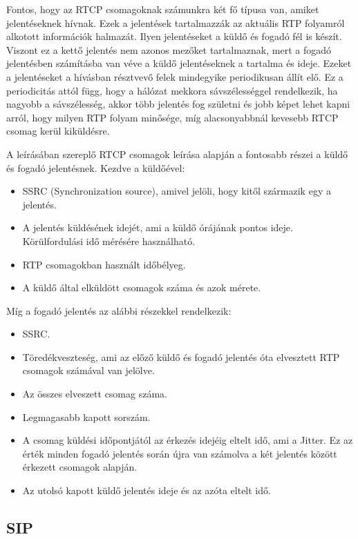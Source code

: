 Fontos, hogy az RTCP csomagoknak számunkra két fő típusa van, amiket jelentéseknek hívnak.
Ezek a jelentések tartalmazzák az aktuális RTP folyamról alkotott információk halmazát. 
Ilyen jelentéseket a küldő és fogadó fél is készít. Viszont ez a kettő jelentés 
nem azonos mezőket tartalmaznak, mert a fogadó jelentésben számításba van véve a küldő 
jelentéseknek a tartalma és ideje. Ezeket a jelentéseket a hívásban résztvevő felek 
mindegyike periodikusan állít elő. Ez a periodicitás attól függ, hogy a hálózat mekkora 
sávszélességgel rendelkezik, ha nagyobb a sávszélesség, akkor több jelentés fog születni 
és jobb képet lehet kapni arról, hogy milyen RTP folyam minősége, míg alacsonyabbnál 
kevesebb RTCP csomag kerül kiküldésre. 

A \cite{RFC3550} leírásában szereplő RTCP csomagok leírása alapján a fontosabb részei a
küldő és fogadó jelentésnek. Kezdve a küldőével: 

\begin{itemize}
	\item SSRC (Synchronization source), amivel jelöli, hogy kitől származik egy a 
	jelentés.
	\item A jelentés küldésének idejét, ami a küldő órájának pontos ideje. Körülfordulási
	idő mérésére használható. 
	\item RTP csomagokban használt időbélyeg. 
	\item A küldő által elküldött csomagok száma és azok mérete.
\end{itemize}

Míg a fogadó jelentés az alábbi részekkel rendelkezik:

\begin{itemize}
	\item SSRC.
	\item Töredékveszteség, ami az előző küldő és fogadó jelentés óta elvesztett RTP 
	csomagok számával van jelölve.
	\item Az összes elveszett csomag száma. 
	\item Legmagasabb kapott sorszám. 
	\item A csomag küldési időpontjától az érkezés idejéig eltelt idő, ami a Jitter. Ez 
	az érték minden fogadó jelentés során újra van számolva a két jelentés között 
	érkezett csomagok alapján.
	\item Az utolsó kapott küldő jelentés ideje és az azóta eltelt idő.  
\end{itemize}

\subsection{SIP}

